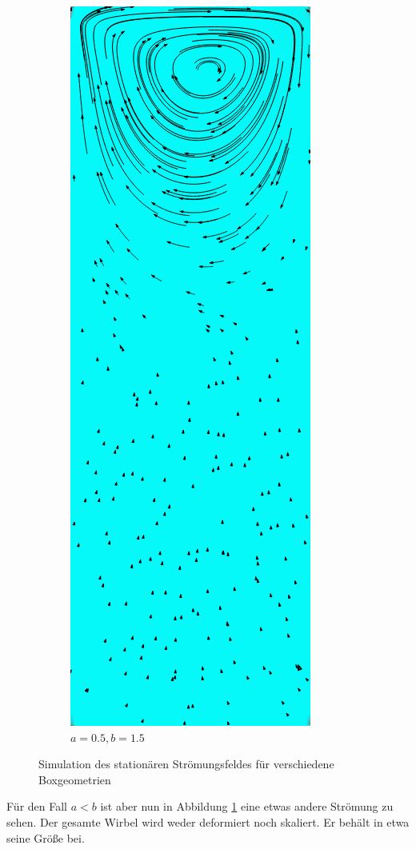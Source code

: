 \begin{figure}[!hptb]
\begin{subfigure}[b]{.5\textwidth}
				\includegraphics[scale = 0.30]{screenshots/box-05-15.png}
				\caption{$a=0.5, b=1.5$}
			\end{subfigure}
			\caption{Simulation des stationären Strömungsfeldes für verschiedene Boxgeometrien}
			\label{fig:box 1}
		\end{figure}

		Für den Fall $a<b$ ist aber nun in Abbildung \ref{fig:box 1} eine etwas andere Strömung zu sehen.
		Der gesamte Wirbel wird weder deformiert noch skaliert.
		Er behält in etwa seine Größe bei.

